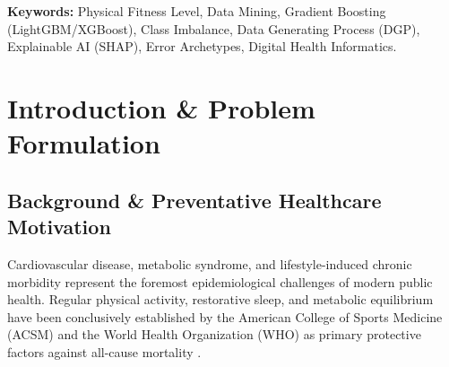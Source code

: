 \documentclass[11pt,a4paper]{article}
\begin{document}
\vspace{1.5em}
\noindent\textbf{Keywords:} Physical Fitness Level, Data Mining, Gradient Boosting (LightGBM/XGBoost), Class Imbalance, Data Generating Process (DGP), Explainable AI (SHAP), Error Archetypes, Digital Health Informatics.

\newpage
\thispagestyle{plain}
\vspace*{-0.5cm}
\begingroup
\small
\setcounter{tocdepth}{2}
\makeatletter
\renewcommand*\l@section[2]{%
  \ifnum \c@tocdepth >\z@
    \addpenalty\@secpenalty
    \addvspace{0.20em \@plus\p@}%
    \setlength\@tempdima{1.5em}%
    \begingroup
      \parindent \z@ \rightskip \@pnumwidth
      \parfillskip -\@pnumwidth
      \leavevmode \bfseries
      \advance\leftskip\@tempdima
      \hskip -\leftskip
      #1\nobreak\hfil \nobreak\hb@xt@\@pnumwidth{\hss #2}\par
    \endgroup
  \fi}
\renewcommand*\l@subsection[2]{%
  \ifnum \c@tocdepth >\@ne
    \addpenalty\@secpenalty
    \addvspace{0.02em \@plus\p@}%
    \@dottedtocline{2}{1.5em}{2.3em}{#1}{#2}%
  \fi}
\makeatother
\linespread{0.90}\selectfont
\tableofcontents
\endgroup
\newpage



\section{Introduction \& Problem Formulation}

\subsection{Background \& Preventative Healthcare Motivation}
Cardiovascular disease, metabolic syndrome, and lifestyle-induced chronic morbidity represent the foremost epidemiological challenges of modern public health. Regular physical activity, restorative sleep, and metabolic equilibrium have been conclusively established by the American College of Sports Medicine (ACSM) and the World Health Organization (WHO) as primary protective factors against all-cause mortality \citep{acsm2021,who2020}. 
\end{document}
